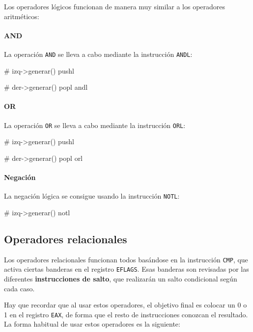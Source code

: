 \documentclass[11pt]{scrartcl}
\begin{document}
Los operadores lógicos funcionan de manera muy similar a los operadores
aritméticos:

\paragraph{AND}

La operación \texttt{AND} se lleva a cabo mediante la instrucción \texttt{ANDL}:

\begin{gascode}
  # izq->generar()
  pushl %

  # der->generar()
  popl %
  andl %
\end{gascode}

\paragraph{OR}

La operación \texttt{OR} se lleva a cabo mediante la instrucción \texttt{ORL}:

\begin{gascode}
  # izq->generar()
  pushl %

  # der->generar()
  popl %
  orl %
\end{gascode}

\paragraph{Negación}

La negación lógica se consigue usando la instrucción \texttt{NOTL}:

\begin{gascode}
  # izq->generar()
  notl %
\end{gascode}

\subsection{Operadores relacionales}

Los operadores relacionales funcionan todos basándose en la instrucción
\texttt{CMP}, que activa ciertas banderas en el registro \texttt{EFLAGS}. Esas
banderas son revisadas por las diferentes \textbf{instrucciones de salto}, que
realizarán un salto condicional según cada caso.

Hay que recordar que al usar estos operadores, el objetivo final es colocar un 0
o 1 en el registro \texttt{EAX}, de forma que el resto de instrucciones conozcan
el resultado. La forma habitual de usar estos operadores es la siguiente:
\end{document}
